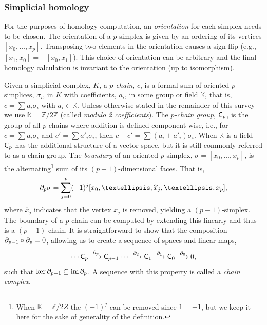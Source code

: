 \documentclass{amsart}
\newcommand{\K}{\mathbb{K}}
\newcommand{\Z}{\mathbb{Z}}
\newcommand{\Cgroup}        {\mm{\sf C}}
\DeclareMathOperator{\im}{im}
\newcommand{\bdr}{\mm{\mathrm{\partial}}}
\newcommand {\mm}[1]        {\ifmmode{#1}\else{\mbox{\(#1\)}}\fi}
\begin{document}
\subsubsection{Simplicial homology}\label{sec:simp_homology}
For the purposes of homology computation, an \emph{orientation} for each simplex needs to be chosen.
The orientation of a $p$-simplex is given by an ordering of its vertices $[x_{0}, \ldots, x_{p}]$.
Transposing two elements in the orientation causes a sign flip (e.g., $[x_1, x_0] = -[x_0, x_1]$).
This choice of orientation can be arbitrary and the final homology calculation is invariant to the orientation (up to isomorphism).

Given a simplicial complex, $K$, a \emph{$p$-chain}, $c$, is a formal sum of oriented $p$-simplices, $\sigma_i$, in $K$ with coefficients, $a_i$, in some group or field $\K$, that is, $c = \sum a_i \sigma_i$ with $a_i \in \K$.
Unless otherwise stated in the remainder of this survey we use $\K=\Z/2\Z$ (called \emph{modulo 2 coefficients}).
The \emph{$p$-chain group}, $\Cgroup_p$, is the group of all $p$-chains where addition is defined component-wise, i.e.,
for $c = \sum a_i \sigma_i$ and $c' = \sum a'_i \sigma_i$, then $c+c'=\sum(a_i+a'_i)\sigma_i$.
When $\K$ is a field $\Cgroup_p$ has the additional structure of a vector space, but it is still commonly referred to as a chain group.
The \emph{boundary} of an oriented $p$-simplex, $\sigma = [x_{0}, \ldots, x_{p}]$, is the alternating\footnote{When $\K=\Z/2Z$ the $(-1)^j$ can be removed since $1=-1$, but we keep it here for the sake of generality of the definition.} sum of its $(p-1)$-dimensional faces.
That is,
\[\bdr_p \sigma = \sum_{j=0}^p (-1)^j[x_{0}, \ldots, \widehat{x}_{j}, \ldots, x_{p}],\]
where $\widehat{x}_{j}$ indicates that the vertex $x_{j}$ is removed, yielding a $(p-1)$-simplex.
The boundary of a $p$-chain can be computed by extending this linearly and thus is a $(p-1)$-chain.
It is straightforward to show that the composition $\bdr_{p-1}\circ \bdr_p = 0$, allowing us to create a sequence of spaces and linear maps,
\[ \cdots \Cgroup_p \stackrel{\bdr_p}{\longrightarrow} \Cgroup_{p-1} \cdots \stackrel{\bdr_2}{\longrightarrow} \Cgroup_1 \stackrel{\bdr_1}{\longrightarrow} \Cgroup_0 \stackrel{\bdr_0}{\longrightarrow} 0, \]
such that $\ker\bdr_{p-1} \subseteq \im\bdr_{p}$.
A sequence with this property is called a \emph{chain complex}.
\end{document}
